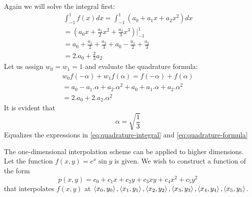 \documentclass[a4paper, oneside]{article}
\begin{document}
\begin{solution}
    Again we will solve the integral first:
    \begin{align}
        \int_{-1}^1 f(x) dx = \int_{-1}^1 (a_0 + a_1 x + a_2x^2) dx                 \\
        = (a_0 x + \frac{a_1}{2} x^2 + \frac{a_2}{3}x^3)\bigg\rvert_{-1}^1          \\
        = a_0 + \frac{a_1}{2} + \frac{a_2}{3} + a_0 - \frac{a_1}{2} + \frac{a_2}{3} \\
        = 2.a_0 + \frac{2}{3}a_2 \label{eq:quadrature-integral}
    \end{align}
    Let us assign $w_0 = w_1 = 1$ and evaluate the quadrature formula:
    \begin{align}
        w_0 f(-\alpha) + w_1 f(\alpha) = f(-\alpha) + f(\alpha)             \\
        = a_0 - a_1.\alpha + a_2.\alpha^2 + a_0 + a_1.\alpha + a_2.\alpha^2 \\
        = 2.a_0 + 2.a_2.\alpha^2 \label{eq:quadrature-formula}
    \end{align}
    It is evident that
    \begin{equation}
        \alpha = \sqrt{\frac{1}{3}}
    \end{equation}
    Equalizes the expressions in \eqref{eq:quadrature-integral} and \eqref{eq:quadrature-formula}
\end{solution}
\begin{problem}
The one-dimensional interpolation scheme can be applied to higher dimensions. Let the function $f(x, y) = e^x \sin y$ is given. We wish to construct a function of the form
\begin{equation}
    p(x, y) = c_0 + c_1x + c_2y + c_3xy + c_4x^2 + c_5y^2
\end{equation}
that interpolates $f(x, y)$ at $\left\langle x_0, y_0\right\rangle, \left\langle x_1, y_1\right\rangle, \left\langle x_2, y_2\right\rangle, \left\langle x_3, y_3\right\rangle, \left\langle x_4, y_4\right\rangle, \left\langle x_5, y_5\right\rangle$.
\end{problem}
\end{document}
